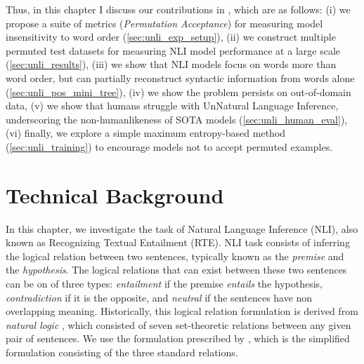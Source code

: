 \documentclass[letterpaper, 12pt]{report}
\newcommand{\PermAcc}{Permutation Acceptance} %
\begin{document}
Thus, in this chapter I discuss our contributions in \citet{sinha-etal-2021-unnatural}, which are as follows:
(i) we propose a suite of metrics (\textit{\PermAcc}) for measuring model insensitivity to word order (\autoref{sec:unli_exp_setup}),
(ii) we construct multiple permuted test datasets for measuring NLI model performance at a large scale (\autoref{sec:unli_results}),
(iii) we show that NLI models focus on words more than word order, but can partially reconstruct syntactic information from words alone (\autoref{sec:unli_pos_mini_tree}), %
(iv) we show the problem persists on out-of-domain data,
(v) we show that humans struggle with UnNatural Language Inference, underscoring the non-humanlikeness of SOTA models (\autoref{sec:unli_human_eval}),
(vi) finally, we explore a simple maximum entropy-based method (\autoref{sec:unli_training}) to encourage models not to accept permuted examples.





\section{Technical Background}
\label{sec:unli_technical_bg}

In this chapter, we investigate the task of Natural Language Inference (NLI), also known as Recognizing Textual Entailment (RTE). NLI task consists of inferring the logical relation between two sentences, typically known as the \textit{premise} and the \textit{hypothesis}. The logical relations that can exist between these two sentences can be on of three types: \textit{entailment} if the premise \textit{entails} the hypothesis, \textit{contradiction} if it is the opposite, and \textit{neutral} if the sentences have non overlapping meaning. Historically, this logical relation formulation is derived from \textit{natural logic} \citep{maccartney-manning-2007-natural}, which consisted of seven set-theoretic relations between any given pair of sentences. We use the formulation prescribed by \cite{bowman-etal-2015-large}, which is the simplified formulation consisting of the three standard relations.
\end{document}
